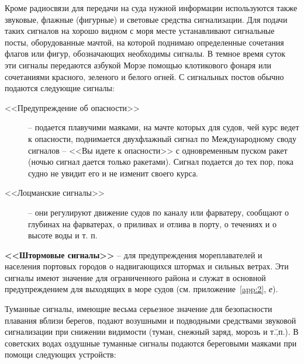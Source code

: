 \documentclass[a4paper, 12pt, twoside, final, book, russian, fittopage, cyremdash]{ncc}
\begin{document}
Кроме радиосвязи для передачи на суда нужной информации используются также звуковые, флажные (фигурные) и световые средства сигнализации. Для подачи таких сигналов на хорошо видном с моря месте устанавливают сигнальные посты, оборудованные мачтой, на которой поднимаю определенные сочетания флагов или фигур, обозначающих необходимы сигналы. В темное время суток эти сигналы передаются азбукой Морзе помощью клотикового фонаря или сочетаниями красного, зеленого и белого огней. С сигнальных постов обычно подаются следующие сигналы:
\begin{description}
\item [<<Предупреждение об опасности>>] \--- подается плавучими маяками, на мачте которых для судов, чей курс ведет к опасности, поднимается двухфлажный сигнал по Международному своду сигналов \--- <<Вы идете к опасности>> с одновременным пуском ракет (ночью сигнал дается только ракетами). Сигнал подается до тех пор, пока судно не увидит его и не изменит своего курса.
\item [<<Лоцманские сигналы>>] \--- они регулируют движение судов по каналу или фарватеру, сообщают о глубинах на фарватерах, о приливах и отлива в порту, о течениях и о высоте воды и т. п.
\end{description}

\textbf{<<Штормовые сигналы>>} \--- для предупреждения мореплавателей и населения портовых городов о надвигающихся штормах и сильных ветрах. Эти сигналы имеют значение для ограниченного района и служат в основной предупреждением для выходящих в море судов (см. приложение~\ref{app:2}, \textit{е}).

Туманные сигналы, имеющие весьма серьезное значение для безопасности плавания вблизи берегов, подают возушными и подводными средствами звуковой сигнализации при снижении видимости (туман, снежный заряд, морозь и т.\=,п.). В советских водах оздушные туманные сигналы подаются береговыми маяками при помощи следующих устройств: 
\end{document}
